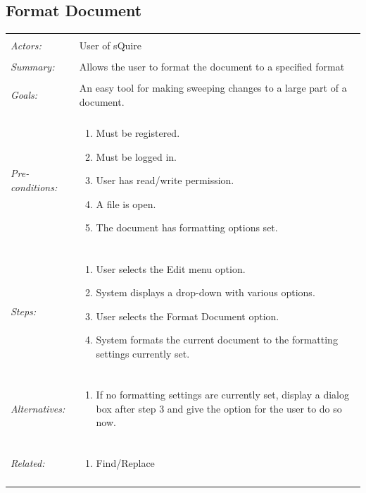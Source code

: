 \documentclass[11pt]{report}
\begin{document}
\subsection{Format Document}
\begin{tabular}{ p{2cm} p{12cm} }
\hline \\
	\textit{Actors:} & User of sQuire \\
	\\
	\textit{Summary:} & Allows the user to format the document to a specified format \\
	\\
	\textit{Goals:} & An easy tool for making sweeping changes to a large part of a document. \\
	\\
	\textit{Pre-conditions:} & \begin{enumerate}
		\item Must be registered.
		\item Must be logged in.
		\item User has read/write permission.
		\item A file is open.
		\item The document has formatting options set.
	\end{enumerate} \\
	\\
	\textit{Steps:} & \begin{enumerate}
		\item User selects the Edit menu option.
		\item System displays a drop-down with various options.
		\item User selects the Format Document option.
		\item System formats the current document to the formatting settings currently set.
	\end{enumerate} \\
	\\
	\textit{Alternatives:} & \begin{enumerate}
		\item If no formatting settings are currently set, display a dialog box after step 3 and give the option for the user to do so now.
	\end{enumerate} \\
	\\
	\textit{Related:} & \begin{enumerate}
		\item Find/Replace
	\end{enumerate} \\
	\\
\hline
\end{tabular}
\newpage
\end{document}
